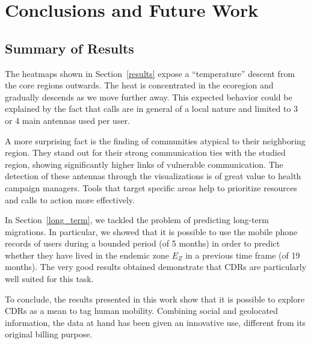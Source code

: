 %
%


\section{Conclusions and Future Work}

\subsection{Summary of Results}

The heatmaps shown in Section~\ref{results} expose a ``temperature'' descent from the core regions outwards. The heat is concentrated in the ecoregion and gradually descends as we move further away. This expected behavior could be explained by the fact that calls are in general of a local nature and limited to 3 or 4 main antennas used per user. 

A more surprising fact is the finding of communities atypical to their neighboring region. They stand out for their strong communication ties with the studied region, showing significantly higher links of vulnerable communication. The detection of these antennas through the visualizations is of great value to health campaign managers. Tools that target specific areas help to prioritize resources and calls to action more effectively.

In Section~\ref{long_term}, we tackled the problem of predicting long-term migrations. In particular, we showed that it is possible to use the mobile phone records of users during a bounded period (of 5 months) in order to predict whether they have lived in the endemic zone $E_Z$ in a previous time frame (of 19 months).
The very good results obtained demonstrate that CDRs are particularly well suited for this task.
 
To conclude, the results presented in this work show that it is possible to explore CDRs as a mean to tag human mobility. Combining social and geolocated information, the data at hand has been given an innovative use, different from its original billing purpose.

